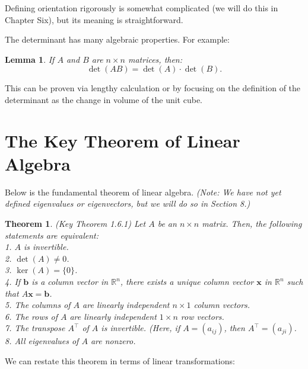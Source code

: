 \documentclass[
]{book}
\newtheorem{theorem}{Theorem}[chapter]
\newtheorem{lemma}{Lemma}[chapter]
\theoremstyle{definition}
\theoremstyle{definition}
\theoremstyle{definition}
\theoremstyle{definition}
\theoremstyle{remark}
\begin{document}
Defining orientation rigorously is somewhat complicated (we will do this in Chapter Six), but its meaning is straightforward.

The determinant has many algebraic properties. For example:

\begin{lemma}
If \(A\) and \(B\) are \(n \times n\) matrices, then:\\
\[ \det(AB) = \det(A) \cdot \det(B). \]
\end{lemma}

This can be proven via lengthy calculation or by focusing on the definition of the determinant as the change in volume of the unit cube.

\hypertarget{the-key-theorem-of-linear-algebra}{%
\section{The Key Theorem of Linear Algebra}\label{the-key-theorem-of-linear-algebra}}

Below is the fundamental theorem of linear algebra. \emph{(Note: We have not yet defined eigenvalues or eigenvectors, but we will do so in Section 8.)}

\begin{theorem}
(Key Theorem 1.6.1) Let \(A\) be an \(n \times n\) matrix. Then, the following statements are equivalent:\\
1. \(A\) is invertible.\\
2. \(\det(A) \neq 0\).\\
3. \(\ker(A) = \{0\}\).\\
4. If \(\mathbf{b}\) is a column vector in \(\mathbb{R}^n\), there exists a unique column vector \(\mathbf{x}\) in \(\mathbb{R}^n\) such that \(A\mathbf{x} = \mathbf{b}\).\\
5. The columns of \(A\) are linearly independent \(n \times 1\) column vectors.\\
6. The rows of \(A\) are linearly independent \(1 \times n\) row vectors.\\
7. The transpose \(A^\top\) of \(A\) is invertible. \emph{(Here, if \(A = (a_{ij})\), then \(A^\top = (a_{ji})\).}\\
8. All eigenvalues of \(A\) are nonzero.
\end{theorem}

We can restate this theorem in terms of linear transformations:
\end{document}

